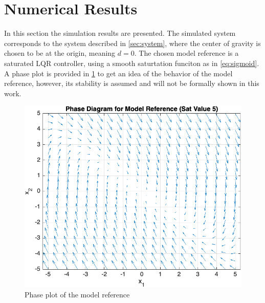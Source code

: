 \section{Numerical Results}
\label{sec:results}
In this section the simulation results are presented. The simulated system corresponds to the system described in \cref{sec:system}, where the center of gravity is chosen to be at the origin, meaning $d=0$. The chosen model reference is a saturated LQR controller, using a smooth saturtation funciton as in \cref{eq:sigmoid}. A phase plot is provided in \cref{fig:model-ref-phase-plot} to get an idea of the behavior of the model reference, however, its stability is assumed and will not be formally shown in this work.

\begin{figure}
    \centering
    \includegraphics[width=0.8\linewidth]{images/phase-diagram-model-ref.png}
    \caption{Phase plot of the model reference}
    \label{fig:model-ref-phase-plot}
\end{figure}



